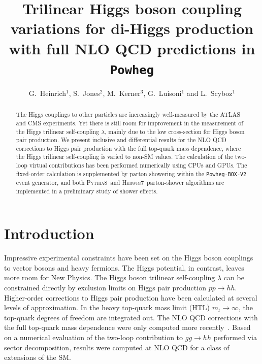\documentclass[a4paper]{jpconf}
\newcommand{\pythia}{\textsc{Pythia8}}
\newcommand{\herwig}{\textsc{Herwig7}}
\begin{document}
\title{Trilinear Higgs boson coupling variations for di-Higgs production with full NLO QCD predictions in \texttt{Powheg}}

\author{G.~Heinrich$^1$, S.~Jones$^2$, M.~Kerner$^3$, G.~Luisoni$^1$ and L.~Scyboz$^1$}

\address{$^1$ Max-Planck-Institut f\"ur Physik (Werner-Heisenberg-Institut), F\"ohringer Ring 6, 80805 M\"unchen, Germany}
\address{$^2$ Theoretical Physics Department, CERN, Geneva, Switzerland}
\address{$^3$ Physik-Institut, Universit\"at Z\"urich, Winterthurerstrasse 190, 8057 Z\"urich, Switzerland}


\begin{abstract}
The Higgs couplings to other particles are increasingly well-measured by the ATLAS and CMS experiments. Yet there is still room for improvement in the measurement of the Higgs trilinear self-coupling $\lambda$, mainly due to the low cross-section for Higgs boson pair production. We present inclusive and differential results for the NLO QCD corrections to Higgs pair production with the full top-quark mass dependence, where the Higgs trilinear self-coupling is varied to non-SM values. The calculation of the two-loop virtual contributions has been performed numerically using CPUs and GPUs. The fixed-order calculation is supplemented by parton showering within the \texttt{Powheg-BOX-V2} event generator, and both \pythia~and \herwig~parton-shower algorithms are implemented in a preliminary study of shower effects.
\end{abstract}


\section{Introduction}

Impressive experimental constraints have been set on the Higgs boson couplings to vector bosons and heavy fermions. The Higgs potential, in contrast, leaves more room for New Physics. The Higgs boson trilinear self-coupling $\lambda$ can be constrained directly by exclusion limits on Higgs pair production $pp \to hh$.
Higher-order corrections to Higgs pair production have been calculated at several levels of approximation. In the heavy top-quark mass limit (HTL) $m_t \to \infty$, the top-quark degrees of freedom are integrated out. The NLO QCD corrections with the full top-quark mass dependence were only computed more recently~\cite{Borowka:2016ehy,Borowka:2016ypz,Baglio:2018lrj}. Based on a numerical evaluation of the two-loop contribution to $gg \to hh$ performed via sector decomposition, results were computed at NLO QCD for a class of extensions of the SM. 
\end{document}
